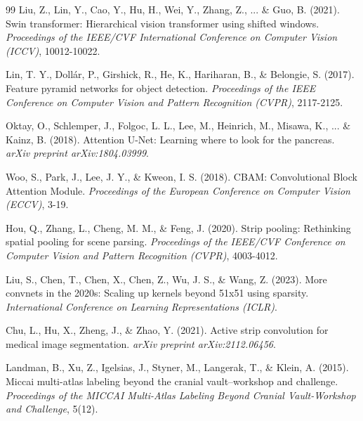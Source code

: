 \documentclass[letterpaper, 10 pt, conference]{ieeeconf}  %
\begin{document}
\begin{thebibliography}{99}
Liu, Z., Lin, Y., Cao, Y., Hu, H., Wei, Y., Zhang, Z., ... \& Guo, B. (2021). Swin transformer: Hierarchical vision transformer using shifted windows. \textit{Proceedings of the IEEE/CVF International Conference on Computer Vision (ICCV)}, 10012-10022.

Lin, T. Y., Dollár, P., Girshick, R., He, K., Hariharan, B., \& Belongie, S. (2017). Feature pyramid networks for object detection. \textit{Proceedings of the IEEE Conference on Computer Vision and Pattern Recognition (CVPR)}, 2117-2125.

Oktay, O., Schlemper, J., Folgoc, L. L., Lee, M., Heinrich, M., Misawa, K., ... \& Kainz, B. (2018). Attention U-Net: Learning where to look for the pancreas. \textit{arXiv preprint arXiv:1804.03999}.

Woo, S., Park, J., Lee, J. Y., \& Kweon, I. S. (2018). CBAM: Convolutional Block Attention Module. \textit{Proceedings of the European Conference on Computer Vision (ECCV)}, 3-19.


Hou, Q., Zhang, L., Cheng, M. M., \& Feng, J. (2020). Strip pooling: Rethinking spatial pooling for scene parsing. \textit{Proceedings of the IEEE/CVF Conference on Computer Vision and Pattern Recognition (CVPR)}, 4003-4012.

Liu, S., Chen, T., Chen, X., Chen, Z., Wu, J. S., \& Wang, Z. (2023). More convnets in the 2020s: Scaling up kernels beyond 51x51 using sparsity. \textit{International Conference on Learning Representations (ICLR)}.

Chu, L., Hu, X., Zheng, J., \& Zhao, Y. (2021). Active strip convolution for medical image segmentation. \textit{arXiv preprint arXiv:2112.06456}.




Landman, B., Xu, Z., Igelsias, J., Styner, M., Langerak, T., \& Klein, A. (2015). Miccai multi-atlas labeling beyond the cranial vault--workshop and challenge. \textit{Proceedings of the MICCAI Multi-Atlas Labeling Beyond Cranial Vault-Workshop and Challenge}, 5(12).


\end{thebibliography}
\end{document}

